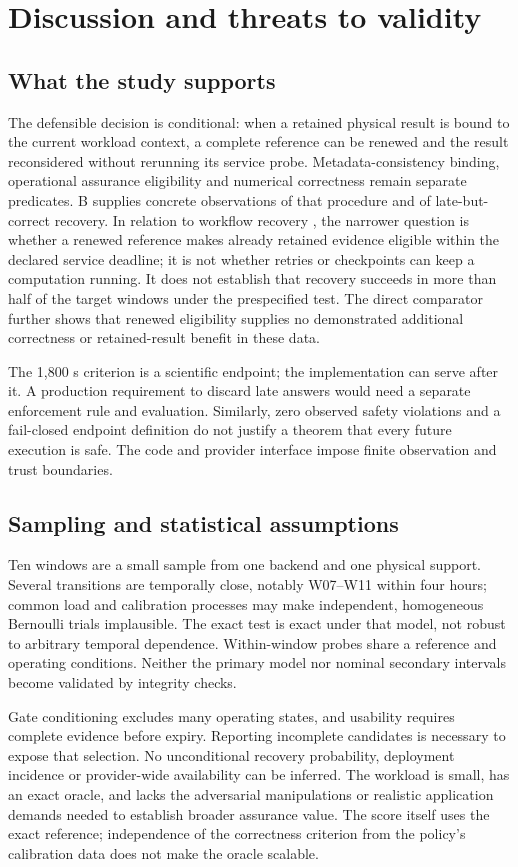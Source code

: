 \documentclass[pdflatex,sn-mathphys-num]{sn-jnl}
\begin{document}
\section{Discussion and threats to validity}
\subsection{What the study supports}
The defensible decision is conditional: when a retained physical result is bound to the current workload context, a complete reference can be renewed and the result reconsidered without rerunning its service probe. Metadata-consistency binding, operational assurance eligibility and numerical correctness remain separate predicates. B supplies concrete observations of that procedure and of late-but-correct recovery. In relation to workflow recovery \cite{workflow}, the narrower question is whether a renewed reference makes already retained evidence eligible within the declared service deadline; it is not whether retries or checkpoints can keep a computation running. It does not establish that recovery succeeds in more than half of the target windows under the prespecified test. The direct comparator further shows that renewed eligibility supplies no demonstrated additional correctness or retained-result benefit in these data.

The 1,800 s criterion is a scientific endpoint; the implementation can serve after it. A production requirement to discard late answers would need a separate enforcement rule and evaluation. Similarly, zero observed safety violations and a fail-closed endpoint definition do not justify a theorem that every future execution is safe. The code and provider interface impose finite observation and trust boundaries.

\subsection{Sampling and statistical assumptions}
Ten windows are a small sample from one backend and one physical support. Several transitions are temporally close, notably W07--W11 within four hours; common load and calibration processes may make independent, homogeneous Bernoulli trials implausible. The exact test is exact under that model, not robust to arbitrary temporal dependence. Within-window probes share a reference and operating conditions. Neither the primary model nor nominal secondary intervals become validated by integrity checks.

Gate conditioning excludes many operating states, and usability requires complete evidence before expiry. Reporting incomplete candidates is necessary to expose that selection. No unconditional recovery probability, deployment incidence or provider-wide availability can be inferred. The workload is small, has an exact oracle, and lacks the adversarial manipulations or realistic application demands needed to establish broader assurance value. The score itself uses the exact reference; independence of the correctness criterion from the policy's calibration data does not make the oracle scalable.
\end{document}
